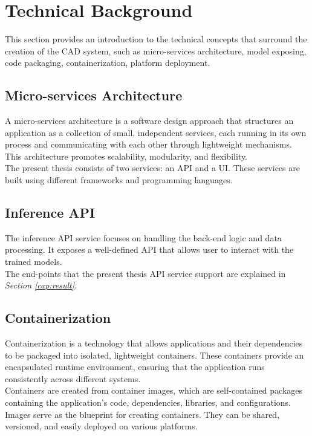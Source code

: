 \newpage

\section{Technical Background}

This section provides an introduction to the technical concepts
that surround the creation of the CAD system, such as micro-services architecture, model exposing, code packaging, containerization, platform deployment.

\subsection{Micro-services Architecture}

A micro-services architecture is a software design approach that structures an application as a collection of small, independent services, each running in its own process and communicating with each other through lightweight mechanisms. This architecture promotes scalability, modularity, and flexibility. \\

The present thesis consists of two services: an API and a UI. These services are built using different frameworks and programming languages.


\subsection{Inference API}

The inference API service focuses on handling the back-end logic and data processing.
It exposes a well-defined API that allows user to interact with the trained models. \\

The end-points that the present thesis API service support are explained in \textit{Section \ref{cap:result}}.

\subsection{Containerization}

Containerization is a technology that allows applications and their dependencies to be packaged into isolated, lightweight containers. These containers provide an encapsulated runtime environment, ensuring that the application runs consistently across different systems. \\

Containers are created from container images, which are self-contained packages containing the application's code, dependencies, libraries, and configurations. Images serve as the blueprint for creating containers. They can be shared, versioned, and easily deployed on various platforms. \\

